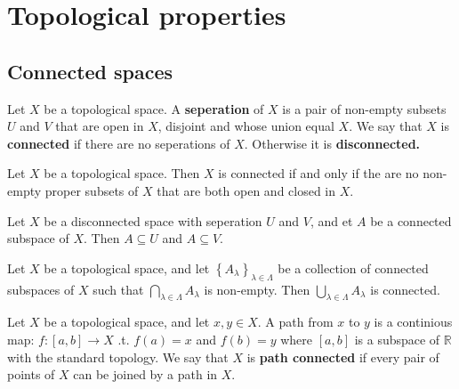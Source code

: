 \documentclass{article}
\theoremstyle{remark}
\begin{document}
\section{ Topological properties}%
\label{sec:chapter_6_topological_properties}

\subsection{Connected spaces}%
\label{sub:connected_spaces}


\begin{definition}
Let $X$ be a topological space. A \textbf{seperation} of $X$ is a pair of non-empty subsets $U $ and $V$ that are open
in $X$, disjoint and whose union equal $X$. We say that $X$ is \textbf{connected} if there are no seperations of $X$.
Otherwise it is \textbf{disconnected.}
\end{definition}

\begin{theorem}
    Let $X$ be a topological space. Then $X$ is connected if and only if the are no non-empty proper subsets of $X$ that
    are both open and closed in $X$.

\end{theorem}

\begin{lemma}[Disconnectivity]
    Let $X$ be a disconnected space with seperation $U$ and $V$,  and et $A$ be a connected subspace of $X$. Then $A
    \subseteq U$ and $A \subseteq  V$.

\end{lemma}

\begin{theorem}
    Let $X$ be a topological space,  and let $\left\{ A_{\lambda } \right\}_{\lambda \in \Lambda }$ be a collection of
    connected subspaces of $X$ such that $ \bigcap_{\lambda  \in \Lambda } A_{\lambda }$ is non-empty. Then $\bigcup
    _{\lambda \in  \Lambda } A_{\lambda }$ is connected.

\end{theorem}

\begin{definition}
    Let $X$ be a topological space, and let $x,y \in X$. A path from $x$ to  $y$ is a continious map:  $f: \left[ a,b
    \right]  \to X$ .t. $f\left( a \right) = x$ and $f\left( b \right) = y$ where $\left[ a,b \right]$ is a subspace of
    $ \mathbb{R} $ with the standard topology. We say that $X$ is \textbf{path connected} if every pair of points of $X
    $ can be joined by a path in $X$.

\end{definition}
\end{document}

